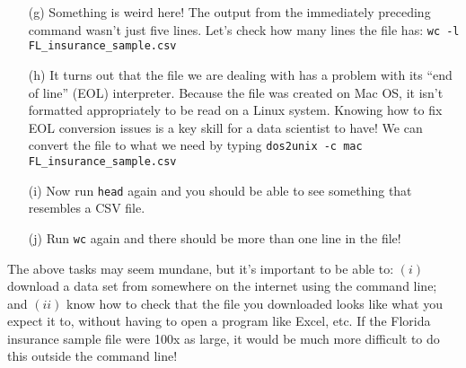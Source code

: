 \documentclass[12pt,english]{exam}
\begin{document}
\begin{questions}
\begin{itemize}
	\item[(g)] Something is weird here! The output from the immediately preceding command wasn't just five lines. Let's check how many lines the file has: \texttt{wc -l FL\_insurance\_sample.csv}
	\item[(h)] It turns out that the file we are dealing with has a problem with its ``end of line'' (EOL) interpreter. Because the file was created on Mac OS, it isn't formatted appropriately to be read on a Linux system. Knowing how to fix EOL conversion issues is a key skill for a data scientist to have! We can convert the file to what we need by typing \texttt{dos2unix -c mac FL\_insurance\_sample.csv}
	\item[(i)] Now run \texttt{head} again and you should be able to see something that resembles a CSV file.
	\item[(j)] Run \texttt{wc} again and there should be more than one line in the file!
\end{itemize}

The above tasks may seem mundane, but it's important to be able to: $(i)$ download a data set from somewhere on the internet using the command line; and $(ii)$ know how to check that the file you downloaded looks like what you expect it to, without having to open a program like Excel, etc. If the Florida insurance sample file were 100x as large, it would be much more difficult to do this outside the command line!


\end{questions}
\end{document}
